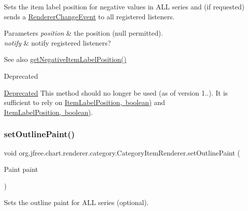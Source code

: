 Sets the item label position for negative values in A\+LL series and (if requested) sends a \mbox{\hyperlink{}{Renderer\+Change\+Event}} to all registered listeners.


\begin{DoxyParams}{Parameters}
{\em position} & the position ({\ttfamily null} permitted). \\
\hline
{\em notify} & notify registered listeners?\\
\hline
\end{DoxyParams}
\begin{DoxySeeAlso}{See also}
\mbox{\hyperlink{interfaceorg_1_1jfree_1_1chart_1_1renderer_1_1category_1_1_category_item_renderer_a3e5a51575b8547693b2ad6a91d2a1fce}{get\+Negative\+Item\+Label\+Position()}}
\end{DoxySeeAlso}
\begin{DoxyRefDesc}{Deprecated}
\item[\mbox{\hyperlink{deprecated__deprecated000179}{Deprecated}}]This method should no longer be used (as of version 1..). It is sufficient to rely on \mbox{\hyperlink{}{Item\+Label\+Position, boolean)}} and \mbox{\hyperlink{}{Item\+Label\+Position, boolean)}}. \end{DoxyRefDesc}
\mbox{\label{interfaceorg_1_1jfree_1_1chart_1_1renderer_1_1category_1_1_category_item_renderer_a119d91fd06285d9c41b599e92f9a3178}} 
\subsubsection{\texorpdfstring{set\+Outline\+Paint()}{setOutlinePaint()}}
{\footnotesize\ttfamily void org.\+jfree.\+chart.\+renderer.\+category.\+Category\+Item\+Renderer.\+set\+Outline\+Paint (\begin{DoxyParamCaption}\item[{Paint}]{paint }\end{DoxyParamCaption})}

Sets the outline paint for A\+LL series (optional).


